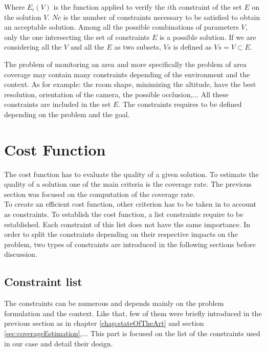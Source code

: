 Where $E_i(V)$ is the function applied to verify  the $i$th constraint of the set $E$ on the solution $V$. $Nc$ is the number of constraints necessary to be satisfied to obtain an acceptable solution.
Among all the possible combinations of parameters $V$, only the one intersecting the set of constraints $E$ is a possible solution.  If we are considering  all the $V$ and all the $E$ as two subsets, $Vs$ is defined as $Vs=V\subset E$. 

The problem of monitoring an area and more specifically the problem of area coverage may contain many constraints depending of the environment and the context. As for example: the room shape, minimizing  the altitude,  have the best resolution, orientation of the camera, the possible occlusion,... All these constraints are included in the set $E$. 
The constraints requires to be defined depending on the problem and the goal.

\section{Cost Function}
The cost function has to evaluate the quality of a given solution. To estimate the quality of a solution one of the main criteria is the coverage rate. The previous section was focused on the computation of the coverage rate. \\
To create an efficient cost function, other criterion has to be taken in to account as constraints.  
 To establish the cost function, a list constraints require to be established. Each constraint of this list does not have the same importance. In order to split the constraints depending on their respective impacts on the problem, two types of constraints are introduced in the  following sections before discussion.
  

\subsection{Constraint list}\label{sec:constraint}

 The constraints can be numerous and depends mainly on the problem formulation and the context. Like that, few of them were briefly introduced in the previous section as in chapter \ref{chap:stateOfTheArt} and section \ref{sec:coverageEstimation},... This part is focused on the list of the constraints used in our case and detail their design.

